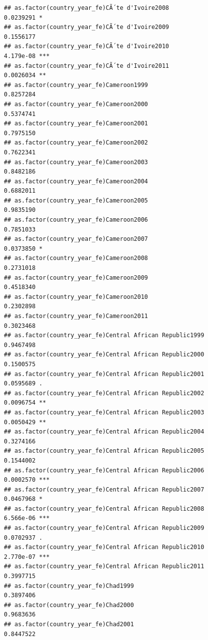 \documentclass[
  a4paper,
]{article}
\begin{document}
\begin{verbatim}
## as.factor(country_year_fe)CÃ´te d'Ivoire2008                   0.0239291 *  
## as.factor(country_year_fe)CÃ´te d'Ivoire2009                   0.1556177    
## as.factor(country_year_fe)CÃ´te d'Ivoire2010                   4.179e-08 ***
## as.factor(country_year_fe)CÃ´te d'Ivoire2011                   0.0026034 ** 
## as.factor(country_year_fe)Cameroon1999                         0.8257284    
## as.factor(country_year_fe)Cameroon2000                         0.5374741    
## as.factor(country_year_fe)Cameroon2001                         0.7975150    
## as.factor(country_year_fe)Cameroon2002                         0.7622341    
## as.factor(country_year_fe)Cameroon2003                         0.8482186    
## as.factor(country_year_fe)Cameroon2004                         0.6882011    
## as.factor(country_year_fe)Cameroon2005                         0.9835190    
## as.factor(country_year_fe)Cameroon2006                         0.7851033    
## as.factor(country_year_fe)Cameroon2007                         0.0373850 *  
## as.factor(country_year_fe)Cameroon2008                         0.2731018    
## as.factor(country_year_fe)Cameroon2009                         0.4518340    
## as.factor(country_year_fe)Cameroon2010                         0.2302898    
## as.factor(country_year_fe)Cameroon2011                         0.3023468    
## as.factor(country_year_fe)Central African Republic1999         0.9467498    
## as.factor(country_year_fe)Central African Republic2000         0.1500575    
## as.factor(country_year_fe)Central African Republic2001         0.0595689 .  
## as.factor(country_year_fe)Central African Republic2002         0.0096754 ** 
## as.factor(country_year_fe)Central African Republic2003         0.0050429 ** 
## as.factor(country_year_fe)Central African Republic2004         0.3274166    
## as.factor(country_year_fe)Central African Republic2005         0.1544002    
## as.factor(country_year_fe)Central African Republic2006         0.0002570 ***
## as.factor(country_year_fe)Central African Republic2007         0.0467968 *  
## as.factor(country_year_fe)Central African Republic2008         6.566e-06 ***
## as.factor(country_year_fe)Central African Republic2009         0.0702937 .  
## as.factor(country_year_fe)Central African Republic2010         2.770e-07 ***
## as.factor(country_year_fe)Central African Republic2011         0.3997715    
## as.factor(country_year_fe)Chad1999                             0.3897406    
## as.factor(country_year_fe)Chad2000                             0.9683636    
## as.factor(country_year_fe)Chad2001                             0.8447522    

\end{verbatim}
\end{document}
